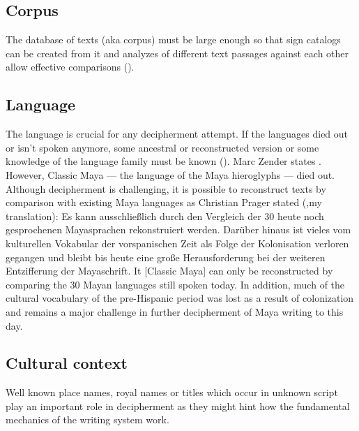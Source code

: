 \documentclass[../main.tex]{subfiles}
\begin{document}
\subsection{Corpus}
The database of texts (aka corpus) must be large enough so that sign catalogs can be created from it 
and analyzes of different text passages against each other allow effective comparisons 
(\cites[2]{zender2017}[44]{coe1992}).

\subsection{Language}
The language is crucial for any decipherment attempt.
If the languages died out or isn't spoken anymore, some ancestral or reconstructed 
version or some knowledge of the language family must be known (\cite[44]{coe1992}).
Marc Zender states .
However, Classic Maya --- the language of the Maya hieroglyphs ---  died out.
Although decipherment is challenging, it is possible to reconstruct texts by comparison 
with existing Maya languages as Christian Prager stated (\cite[6]{prager2018},my translation): 
{
    Es kann ausschließlich durch den Vergleich der 30 heute noch 
    gesprochenen Mayasprachen rekonstruiert werden. 
    Darüber hinaus ist vieles vom kulturellen Vokabular der vorspanischen Zeit als Folge der 
    Kolonisation verloren gegangen und bleibt bis heute eine große Herausforderung bei der 
    weiteren Entzifferung der Mayaschrift.
}
{
    It [Classic Maya] can only be reconstructed by comparing the 30 Mayan languages still 
    spoken today. 
    In addition, much of the cultural vocabulary of the pre-Hispanic period was lost as a result of 
    colonization and remains a major challenge in further decipherment of Maya writing 
    to this day.
}

\subsection{Cultural context}
Well known place names, royal names or titles which occur in unknown script
play an important role in decipherment as they might hint how the fundamental mechanics of 
the writing system work.
\end{document}

